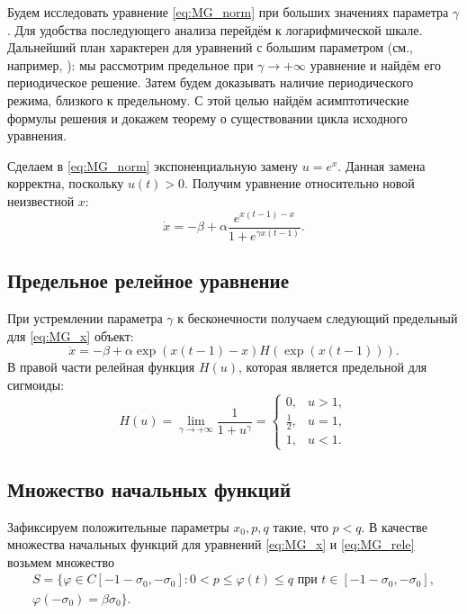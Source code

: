 Будем исследовать уравнение \eqref{eq:MG_norm} при больших значениях параметра $\gamma$. Для удобства последующего анализа перейдём к логарифмической шкале. Дальнейший план характерен для уравнений с большим параметром (см., например, \cite{Kolesov2010}): мы рассмотрим предельное при $\gamma\to+\infty$ уравнение и найдём его периодическое решение. Затем будем доказывать наличие периодического режима, близкого к предельному. С этой целью найдём асимптотические формулы решения и докажем теорему о существовании цикла исходного уравнения.

Сделаем в \eqref{eq:MG_norm} экспоненциальную замену $u=e^x$. Данная замена корректна, поскольку $u(t) > 0$. Получим уравнение относительно новой неизвестной $x$:
\begin{equation}
    \label{eq:MG_x}
    \dot{x}=-\beta+\alpha\frac{e^{x(t-1)-x}}{1+e^{\gamma x(t-1)}}.
\end{equation}

\subsection{Предельное релейное уравнение}
При устремлении параметра $\gamma$ к бесконечности получаем следующий предельный для \eqref{eq:MG_x} объект:
\begin{equation}
    \label{eq:MG_rele}
    \dot{x}=-\beta + \alpha \exp({x(t-1)-x})H(\exp({x(t-1)})).
\end{equation}
В правой части релейная функция $H(u)$, которая является предельной для сигмоиды:
\begin{equation}
    \label{eq:H}
    H(u)=\lim\limits_{\gamma\to +\infty}\frac{1}{1+u^{\gamma}}=
    \begin{cases}
        0, & u > 1,\\
        \frac{1}{2}, & u = 1,\\
        1, & u < 1.
    \end{cases}
\end{equation}

\subsection{Множество начальных функций}
Зафиксируем положительные параметры $x_0, p, q$ такие, что $p < q$. В качестве множества начальных функций для уравнений \eqref{eq:MG_x} и \eqref{eq:MG_rele} возьмем множество
\begin{multline}
    \label{eq:init_set}
    S=\{\varphi\in C[-1 - \sigma_0, -\sigma_0]: 0 < p \leqslant \varphi(t)\leqslant q \text{ при } t \in [-1 - \sigma_0, -\sigma_0],\\ \varphi(-\sigma_0) = \beta \sigma_0 \}.
\end{multline}

